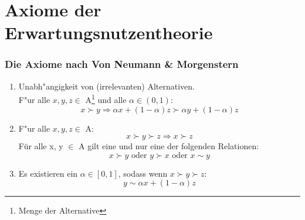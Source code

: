\documentclass{beamer}
\begin{document}
\section{Axiome der Erwartungsnutzentheorie}
\label{sec:einfuhrung}
\begin{frame}
  \frametitle{Die Axiome nach Von Neumann \& Morgenstern}
   \begin{enumerate}
  \item<1,4> Unabh"angigkeit von (irrelevanten) Alternativen.\\
    F"ur alle $x, y, z \in$ A\footnote{Menge der Alternative} und alle $\alpha \in (0,1)$:\\
    \begin{equation}
      \label{eq:4}
      x \succ y \Rightarrow \alpha x +(1-\alpha) z \succ \alpha y + (1-\alpha) z  \tag{Unabh"angigkeit}
    \end{equation}

        
  \item<2> F"ur alle $x, y, z \in$ A:
      \begin{equation}
      \label{eq:1}
     x \succ y \succ z \Rightarrow x \succ z \tag{Transitivit"at}
    \end{equation}
    F\"ur alle x, y $\in$ A gilt eine und nur eine der folgenden Relationen:
    \begin{equation}
      \label{eq:2}
     x \succ y \text{ oder } y \succ x \text{ oder } x \sim y \tag{Vollst"andigkeit  \& Asymmetrie}
    \end{equation}
  \item<3> Es existieren ein $\alpha \in [0,1]$, sodass wenn $x \succ y \succ z$:
    \begin{equation}
      \label{eq:3}
      y \sim \alpha x + (1-\alpha) z \tag{Stetigkeit}
    \end{equation}
  \end{enumerate}

\end{frame}
\end{document}
